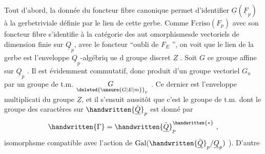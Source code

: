  Tout d'abord, la donnée du foncteur fibre canonique permet d'identifier $\underline{G}(\underline{F}_p)$ à la gerbe\handwritten{/}triviale définie par le lien  de cette gerbe. Comme $\mathrm{Fcriso}(F_p)$ avec son foncteur fibre s'identifie à la catégorie des aut omorphismesde vectoriels de dimension finie sur $\underline{Q}_p$, avec le foncteur ``oubli de $F_E$ '', on voit que le lien de la gerbe est l'enveloppe $\underline{Q}_p$-algébriq ue d groupe discret $\underline{Z}$ . Soit $G$ ce groupe affine sur $\underline{Q}_p$ . Il est évidemment commutatif, donc produit d'un groupe vectoriel $G_u$ par un groupe de t.m. $\underset{\deleted{\unsure{G|E|m}}}{G}_r$ .
Ce dernier est l'enveloppe  multiplicati du groupe $\underline{Z}$, et il s'ensuit aussitôt que c'est le groupe de t.m. dont le groupe des caractères sur $\handwritten{\bar{\underline{Q}}}_p$ est donné par
\[
\handwritten{\Gamma}=\handwritten{\bar{\underline{Q}}}_p^{\handwritten{*}}\ ,
\]
\handwritten{(}isomorphsme compatible avec l'action de $\operatorname{Gal}(\handwritten{\bar{\underline{Q}}}_p/\underline{Q}_p)$ ). D'autre
